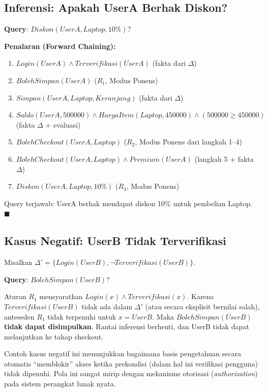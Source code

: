 \subsection{Inferensi: Apakah UserA Berhak Diskon?}

\begin{contoh}
\textbf{Query}: $Diskon(UserA, Laptop, 10\%)$?

\textbf{Penalaran (Forward Chaining):}
\begin{enumerate}
    \item $Login(UserA) \wedge Terverifikasi(UserA)$ \hfill (fakta dari $\Delta$)
    \item $BolehSimpan(UserA)$ \hfill ($R_1$, Modus Ponens)
    \item $Simpan(UserA, Laptop, Keranjang)$ \hfill (fakta dari $\Delta$)
    \item $Saldo(UserA, 500000) \wedge HargaItem(Laptop, 450000) \wedge (500000 \geq 450000)$
    \hfill (fakta $\Delta$ + evaluasi)
    \item $BolehCheckout(UserA, Laptop)$ \hfill ($R_2$, Modus Ponens dari langkah 1--4)
    \item $BolehCheckout(UserA, Laptop) \wedge Premium(UserA)$ \hfill (langkah 5 + fakta $\Delta$)
    \item $Diskon(UserA, Laptop, 10\%)$ \hfill ($R_3$, Modus Ponens)
\end{enumerate}

Query terjawab: UserA berhak mendapat diskon 10\% untuk pembelian Laptop. $\blacksquare$
\end{contoh}

\subsection{Kasus Negatif: UserB Tidak Terverifikasi}

\begin{contoh}
Misalkan $\Delta' = \{Login(UserB), \neg Terverifikasi(UserB)\}$.

\textbf{Query}: $BolehSimpan(UserB)$?

Aturan $R_1$ mensyaratkan $Login(x) \wedge Terverifikasi(x)$. Karena $Terverifikasi(UserB)$ tidak ada dalam $\Delta'$ (atau secara eksplisit bernilai salah), anteseden $R_1$ tidak terpenuhi untuk $x = UserB$. Maka $BolehSimpan(UserB)$ \textbf{tidak dapat disimpulkan}. Rantai inferensi berhenti, dan UserB tidak dapat melanjutkan ke tahap checkout.
\end{contoh}

\begin{catatan}
Contoh kasus negatif ini menunjukkan bagaimana basis pengetahuan secara otomatis ``memblokir'' akses ketika prekondisi (dalam hal ini verifikasi pengguna) tidak dipenuhi. Pola ini sangat mirip dengan mekanisme otorisasi (\textit{authorization}) pada sistem perangkat lunak nyata.
\end{catatan}
